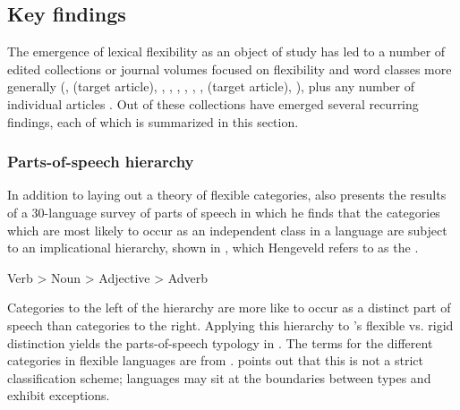 \subsection{Key findings}
\label{sec:2.3.2}

The emergence of lexical flexibility as an object of study has led to a number of edited collections or journal volumes focused on flexibility and word classes more generally (\cite{VogelComrie2000}, \cite{EvansOsada2005} (target article), \cite{AnsaldoPfau2010}, \cite{LoisVapnarsky2010}, \cite{RijkhoffLier2013}, \cite{Simone2014}, \cite{BlaszczakKlimekJankowskaMigdalski2015}, \cite{VapnarksyVeneziano2017}, \cite{Lier2017} (target article), \cite{CuyckensHeyvaertHartmann2019}), plus any number of individual articles . Out of these collections have emerged several recurring findings, each of which is summarized in this section.

\subsubsection{Parts-of-speech hierarchy}
\label{sec:2.3.2.1}

In addition to laying out a theory of flexible categories, \textcite{Hengeveld1992} also presents the results of a 30-language survey of parts of speech in which he finds that the categories which are most likely to occur as an independent class in a language are subject to an implicational hierarchy, shown in , which Hengeveld refers to as the .

\begin{exe}
  \ex\label{ex:2.3} Verb > Noun > Adjective > Adverb
\end{exe}

\noindent Categories to the left of the hierarchy are more like to occur as a distinct part of speech than categories to the right. Applying this hierarchy to \citeauthor{Hengeveld1992}'s flexible vs. rigid distinction yields the parts-of-speech typology in  . The terms for the different categories in flexible languages are from \textcite{HengeveldRijkhoffSiewierska2004}. \citeauthor{Hengeveld1992} points out that this is not a strict classification scheme; languages may sit at the boundaries between types and exhibit exceptions.

